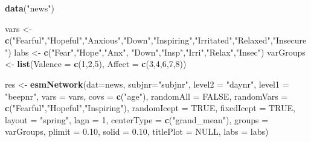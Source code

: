 \documentclass[man,floatsintext]{apa6}
\newenvironment{Shaded}{\begin{snugshade}}{\end{snugshade}}
\newcommand{\KeywordTok}[1]{\textcolor[rgb]{0.13,0.29,0.53}{\textbf{#1}}}
\newcommand{\DataTypeTok}[1]{\textcolor[rgb]{0.13,0.29,0.53}{#1}}
\newcommand{\DecValTok}[1]{\textcolor[rgb]{0.00,0.00,0.81}{#1}}
\newcommand{\FloatTok}[1]{\textcolor[rgb]{0.00,0.00,0.81}{#1}}
\newcommand{\StringTok}[1]{\textcolor[rgb]{0.31,0.60,0.02}{#1}}
\newcommand{\OtherTok}[1]{\textcolor[rgb]{0.56,0.35,0.01}{#1}}
\newcommand{\NormalTok}[1]{#1}
\begin{document}
\begin{Shaded}
\begin{Highlighting}[]
\KeywordTok{data}\NormalTok{(}\StringTok{"news"}\NormalTok{)}

\NormalTok{vars <-}\StringTok{ }\KeywordTok{c}\NormalTok{(}\StringTok{"Fearful"}\NormalTok{,}\StringTok{"Hopeful"}\NormalTok{,}\StringTok{"Anxious"}\NormalTok{,}\StringTok{"Down"}\NormalTok{,}\StringTok{"Inspiring"}\NormalTok{,}\StringTok{"Irritated"}\NormalTok{,}\StringTok{"Relaxed"}\NormalTok{,}\StringTok{"Insecure"}\NormalTok{)}
\NormalTok{labs <-}\StringTok{ }\KeywordTok{c}\NormalTok{(}\StringTok{"Fear"}\NormalTok{,}\StringTok{"Hope"}\NormalTok{,}\StringTok{"Anx"}\NormalTok{, }\StringTok{"Down"}\NormalTok{,}\StringTok{"Insp"}\NormalTok{,}\StringTok{"Irri"}\NormalTok{,}\StringTok{"Relax"}\NormalTok{,}\StringTok{"Insec"}\NormalTok{)}
\NormalTok{varGroups <-}\StringTok{ }\KeywordTok{list}\NormalTok{(}\DataTypeTok{Valence =} \KeywordTok{c}\NormalTok{(}\DecValTok{1}\NormalTok{,}\DecValTok{2}\NormalTok{,}\DecValTok{5}\NormalTok{), }\DataTypeTok{Affect =} \KeywordTok{c}\NormalTok{(}\DecValTok{3}\NormalTok{,}\DecValTok{4}\NormalTok{,}\DecValTok{6}\NormalTok{,}\DecValTok{7}\NormalTok{,}\DecValTok{8}\NormalTok{))    }

\NormalTok{res <-}\StringTok{ }\KeywordTok{esmNetwork}\NormalTok{(}\DataTypeTok{dat=}\NormalTok{news, }
                \DataTypeTok{subjnr=}\StringTok{"subjnr"}\NormalTok{, }
                \DataTypeTok{level2 =} \StringTok{"daynr"}\NormalTok{, }
                \DataTypeTok{level1 =} \StringTok{"beepnr"}\NormalTok{,}
                \DataTypeTok{vars =}\NormalTok{ vars,}
                \DataTypeTok{covs =} \KeywordTok{c}\NormalTok{(}\StringTok{"age"}\NormalTok{),}
                \DataTypeTok{randomAll =} \OtherTok{FALSE}\NormalTok{,}
                \DataTypeTok{randomVars =}  \KeywordTok{c}\NormalTok{(}\StringTok{"Fearful"}\NormalTok{,}\StringTok{"Hopeful"}\NormalTok{,}\StringTok{"Inspiring"}\NormalTok{),}
                \DataTypeTok{randomIcept =} \OtherTok{TRUE}\NormalTok{,}
                \DataTypeTok{fixedIcept =} \OtherTok{TRUE}\NormalTok{,}
                \DataTypeTok{layout =} \StringTok{"spring"}\NormalTok{,}
                \DataTypeTok{lagn =} \DecValTok{1}\NormalTok{,}
                \DataTypeTok{centerType =} \KeywordTok{c}\NormalTok{(}\StringTok{"grand_mean"}\NormalTok{),}
                \DataTypeTok{groups =}\NormalTok{ varGroups,}
                \DataTypeTok{plimit =} \FloatTok{0.10}\NormalTok{,}
                \DataTypeTok{solid =} \FloatTok{0.10}\NormalTok{,}
                \DataTypeTok{titlePlot =} \OtherTok{NULL}\NormalTok{,}
                \DataTypeTok{labs =}\NormalTok{ labs)}
\end{Highlighting}
\end{Shaded}
\end{document}
